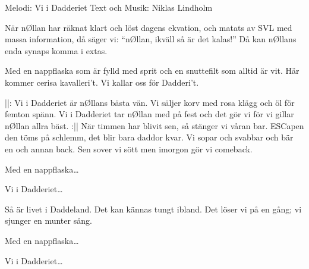 \begin{song}

\begin{songmeta}
Melodi: Vi i Dadderiet
Text och Musik: Niklas Lindholm
\end{songmeta}

\begin{songtext}
När nØllan har räknat klart
och löst dagens ekvation,
och matats av SVL
med massa information,
då säger vi: \textquotedblleft{}nØllan,
ikväll så är det kalas!\textquotedblright{}
Då kan nØllans enda synaps
komma i extas.

Med en nappflaska
som är fylld med sprit
och en snuttefilt
som alltid är vit.
Här kommer cerisa kavalleri't.
Vi kallar oss för Dadderi't.

||: Vi i Dadderiet är nØllans bästa vän.
Vi säljer korv med rosa klägg
och öl för femton spänn.
Vi i Dadderiet tar nØllan med på fest
och det gör vi för vi gillar nØllan allra bäst. :||
\newpage
När timmen har blivit sen,
så stänger vi våran bar.
ESCapen den töms på schlemm,
det blir bara daddor kvar.
Vi sopar och svabbar
och bär en och annan back.
Sen sover vi sött
men imorgon gör vi comeback.

Med en nappflaska\ldots

Vi i Dadderiet\ldots

Så är livet i Daddeland.
Det kan kännas tungt ibland.
Det löser vi på en gång;
vi sjunger en munter sång.

Med en nappflaska\ldots

Vi i Dadderiet\ldots

\end{songtext}
\end{song}
